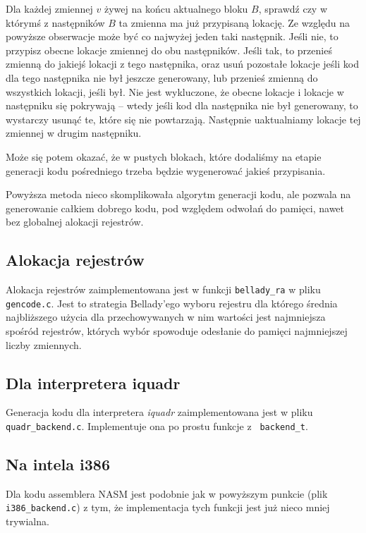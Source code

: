 \documentclass[a4paper,12pt]{article}
\begin{document}
Dla każdej zmiennej $v$ żywej na końcu aktualnego bloku $B$, sprawdź czy
w którymś z następników $B$ ta zmienna ma już przypisaną lokację. Ze
względu na powyższe obserwacje może być co najwyżej jeden taki
następnik. Jeśli nie, to przypisz obecne lokacje zmiennej do obu
następników. Jeśli tak, to przenieś zmienną do jakiejś lokacji z tego
następnika, oraz usuń pozostałe lokacje jeśli kod dla tego następnika
nie był jeszcze generowany, lub przenieś zmienną do wszystkich lokacji,
jeśli był. Nie jest wykluczone, że obecne lokacje i lokacje w następniku
się pokrywają -- wtedy jeśli kod dla następnika nie był generowany, to
wystarczy usunąć te, które się nie powtarzają. Następnie uaktualniamy
lokacje tej zmiennej w drugim następniku.

Może się potem okazać, że w pustych blokach, które dodaliśmy na etapie
generacji kodu pośredniego trzeba będzie wygenerować jakieś przypisania.

Powyższa metoda nieco skomplikowała algorytm generacji kodu, ale pozwala
na generowanie całkiem dobrego kodu, pod względem odwołań do pamięci,
nawet bez globalnej alokacji rejestrów.


\subsection{Alokacja rejestrów}

Alokacja rejestrów zaimplementowana jest w funkcji {\tt bellady\_ra} w
pliku {\tt gencode.c}. Jest to strategia Bellady'ego wyboru rejestru dla
którego średnia najbliższego użycia dla przechowywanych w nim wartości
jest najmniejsza spośród rejestrów, których wybór spowoduje odesłanie do
pamięci najmniejszej liczby zmiennych.

\subsection{Dla interpretera iquadr}

Generacja kodu dla interpretera {\em iquadr} zaimplementowana jest w
pliku {\tt quadr\_backend.c}. Implementuje ona po prostu funkcje z {\tt
backend\_t}.

\subsection{Na intela i386}

Dla kodu assemblera NASM jest podobnie jak w powyższym punkcie (plik
{\tt i386\_backend.c}) z tym, że implementacja tych funkcji jest już
nieco mniej trywialna.
\end{document}
